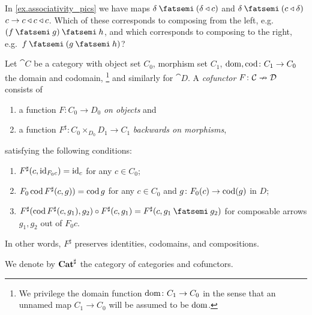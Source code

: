 \documentclass[DynamicalBook]{subfiles}
\begin{document}
\begin{exercise}
In \cref{ex.associativity_pics} we have maps $\delta\then(\delta\tri c)$ and $\delta\then(c\tri\delta)$ $c\to c\mathbin{\triangleleft} c\mathbin{\triangleleft} c$. Which of these corresponds to composing from the left, e.g.\ $(f\then g)\then h$, and which corresponds to composing to the right, e.g.\ $f\then (g\then h)$?
\end{exercise}

\begin{definition}[Cofunctor]\label{def.cofunctor}
Let $\cat{C}$ be a category with object set $C_0$, morphism set $C_1$, $\operatorname{dom},\operatorname{cod}\colon C_1\to C_0$ the domain and codomain,%
\footnote{We privilege the domain function $\operatorname{dom}\colon C_1\to C_0$ in the sense that an unnamed map $C_1\to C_0$ will be assumed to be $\operatorname{dom}$.}
 and similarly for $\cat{D}$. A \emph{cofunctor} $F\colon \mathcal{C}\nrightarrow \mathcal{D}$ consists of
\begin{enumerate}[itemsep=0pt]
  \item a function  $F\colon C_0\to D_0$ \emph{on objects} and
  \item a function $F^\sharp\colon C_0\times_{D_0}D_1\to C_1$ \emph{backwards on morphisms},
\end{enumerate}
satisfying the following conditions:
\begin{enumerate}[itemsep=0pt, label=\roman*.]
	\item $F^\sharp(c,\mathrm{id}_{F_0c})=\mathrm{id}_c$ for any $c\in C_0$;
	\item $F_0\operatorname{cod} F^\sharp(c,g))=\operatorname{cod} g$ for any $c\in C_0$ and $g\colon F_0(c)\to\operatorname{cod}(g)$ in $D$;
	\item $F^\sharp(\cod F^\sharp(c,g_1),g_2)\circ F^\sharp(c,g_1)=F^\sharp(c,g_1\then g_2)$ for composable arrows $g_1,g_2$ out of $F_0 c$.
\end{enumerate}
In other words, $F^\sharp$ preserves identities, codomains, and compositions.

We denote by $\textbf{Cat}^\sharp$ the category of categories and cofunctors.
\end{definition}
\end{document}
